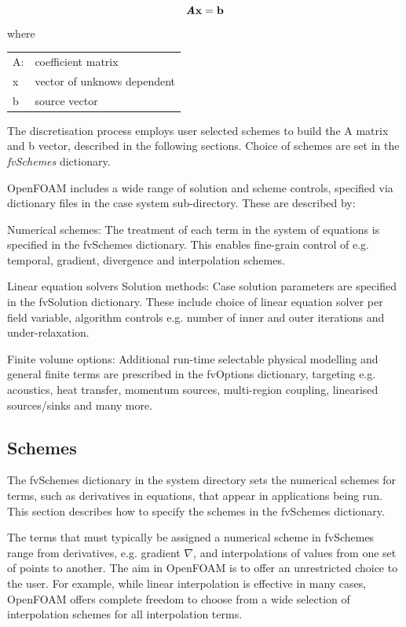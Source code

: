 \documentclass{article}
\begin{document}
\begin{equation}
\textit{\textbf{A}}\textbf{x} = \textbf{b}
\end{equation}
where
\begin{table}[hbp!]
\begin{tabular}{l l}
	A: &   coefficient matrix\\
	x & vector of unknows dependent\\
	b & source vector
\end{tabular}
\end{table}

The discretisation process employs user selected schemes to build the A matrix and b vector, described in the following sections. Choice of schemes are set in the \textit{fvSchemes} dictionary.

OpenFOAM includes a wide range of solution and scheme controls, specified via dictionary files in the case system sub-directory. These are described by:

Numerical schemes: The treatment of each term in the system of equations is specified in the fvSchemes dictionary. This enables fine-grain control of e.g. temporal, gradient, divergence and interpolation schemes.

Linear equation solvers Solution methods: Case solution parameters are specified in the fvSolution dictionary. These include choice of linear equation solver per field variable, algorithm controls e.g. number of inner and outer iterations and under-relaxation.

Finite volume options: Additional run-time selectable physical modelling and general finite terms are prescribed in the fvOptions dictionary, targeting e.g. acoustics, heat transfer, momentum sources, multi-region coupling, linearised sources/sinks and many more.

\subsection{Schemes}

The fvSchemes dictionary in the system directory sets the numerical schemes for terms, such as derivatives in equations, that appear in applications being run. This section describes how to specify the schemes in the fvSchemes dictionary.

The terms that must typically be assigned a numerical scheme in fvSchemes range from derivatives, e.g. gradient $\nabla$, and interpolations of values from one set of points to another. The aim in OpenFOAM is to offer an unrestricted choice to the user. For example, while linear interpolation is effective in many cases, OpenFOAM offers complete freedom to choose from a wide selection of interpolation schemes for all interpolation terms.
\end{document}
